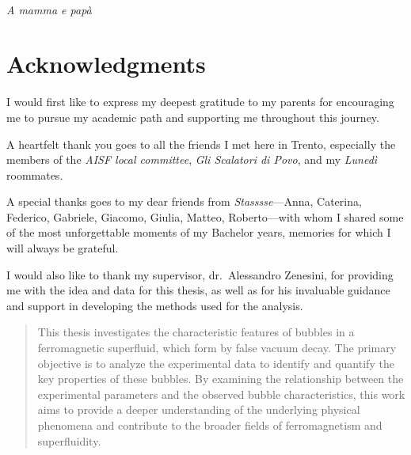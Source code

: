 

\LogoWidth{4.5cm} %

\frontmatter
\begin{titlepage}
    \pagestyle{empty}
    \makefrontpage
    \restoregeometry
\end{titlepage}

\thispagestyle{empty} %


~ \newpage
\null{}
\begin{flushright}
    \textit{A mamma e papà}
\end{flushright}
\null

\chapter*{Acknowledgments}
I would first like to express my deepest gratitude to my parents for encouraging me to pursue my academic path and supporting me throughout this journey.

A heartfelt thank you goes to all the friends I met here in Trento, especially the members of the \textit{AISF local committee}, \textit{Gli Scalatori di Povo}, and my \textit{Lunedì} roommates.

A special thanks goes to my dear friends from \textit{Stasssse}—Anna, Caterina, Federico, Gabriele, Giacomo, Giulia, Matteo, Roberto—with whom I shared some of the most unforgettable moments of my Bachelor years, memories for which I will always be grateful.

I would also like to thank my supervisor, dr.\ Alessandro Zenesini, for providing me with the idea and data for this thesis, as well as for his invaluable guidance and support in developing the methods used for the analysis.

\begin{abstract}
    This thesis investigates the characteristic features of bubbles in a ferromagnetic superfluid, which form by false vacuum decay. The primary objective is to analyze the experimental data to identify and quantify the key properties of these bubbles. By examining the relationship between the experimental parameters and the observed bubble characteristics, this work aims to provide a deeper understanding of the underlying physical phenomena and contribute to the broader fields of ferromagnetism and superfluidity.
\end{abstract}


